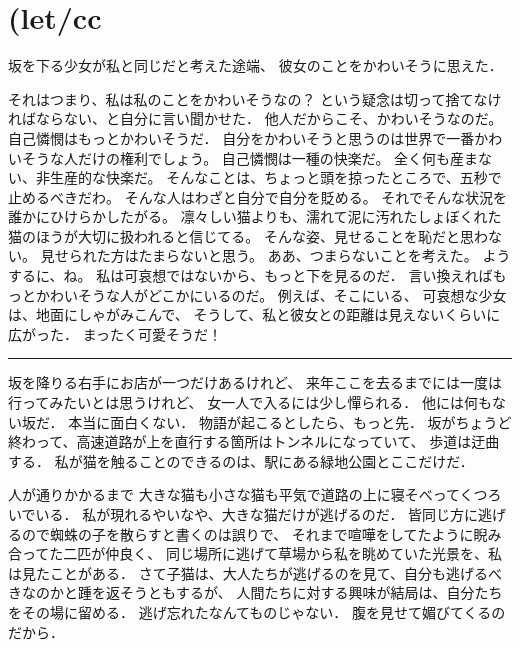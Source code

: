 \documentclass[]{article}
\begin{document}
\section{(let/cc}\label{letcc}

坂を下る少女が私と同じだと考えた途端、 彼女のことをかわいそうに思えた．

それはつまり、私は私のことをかわいそうなの？
という疑念は切って捨てなければならない、と自分に言い聞かせた．
他人だからこそ、かわいそうなのだ。 自己憐憫はもっとかわいそうだ．
自分をかわいそうと思うのは世界で一番かわいそうな人だけの権利でしょう。
自己憐憫は一種の快楽だ。 全く何も産まない、非生産的な快楽だ。
そんなことは、ちょっと頭を掠ったところで、五秒で止めるべきだわ。
そんな人はわざと自分で自分を貶める。
それでそんな状況を誰かにひけらかしたがる。
凛々しい猫よりも、濡れて泥に汚れたしょぼくれた猫のほうが大切に扱われると信じてる。
そんな姿、見せることを恥だと思わない。 見せられた方はたまらないと思う。
ああ、つまらないことを考えた。 ようするに、ね。
私は可哀想ではないから、もっと下を見るのだ．
言い換えればもっとかわいそうな人がどこかにいるのだ。
例えば、そこにいる、 可哀想な少女は、地面にしゃがみこんで、
そうして、私と彼女との距離は見えないくらいに広がった．
まったく可愛そうだ！

\begin{center}\rule{3in}{0.4pt}\end{center}

坂を降りる右手にお店が一つだけあるけれど、
来年ここを去るまでには一度は行ってみたいとは思うけれど、
女一人で入るには少し憚られる． 他には何もない坂だ． 本当に面白くない．
物語が起こるとしたら、もっと先．
坂がちょうど終わって、高速道路が上を直行する箇所はトンネルになっていて、
歩道は迂曲する．
私が猫を触ることのできるのは、駅にある緑地公園とここだけだ．

人が通りかかるまで
大きな猫も小さな猫も平気で道路の上に寝そべってくつろいでいる．
私が現れるやいなや、大きな猫だけが逃げるのだ．
皆同じ方に逃げるので蜘蛛の子を散らすと書くのは誤りで、
それまで喧嘩をしてたように睨み合ってた二匹が仲良く、
同じ場所に逃げて草場から私を眺めていた光景を、私は見たことがある．
さて子猫は、大人たちが逃げるのを見て、自分も逃げるべきなのかと踵を返そうともするが、
人間たちに対する興味が結局は、自分たちをその場に留める．
逃げ忘れたなんてものじゃない． 腹を見せて媚びてくるのだから．
\end{document}

